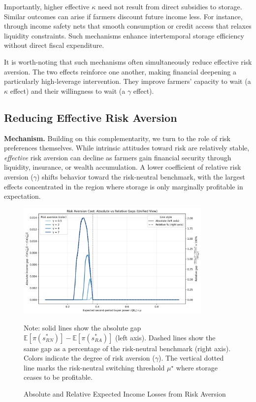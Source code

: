 Importantly, higher effective $\kappa$ need not result from direct subsidies to storage. Similar outcomes can arise if farmers discount future income less. For instance, through income safety nets that smooth consumption or credit access that relaxes liquidity constraints. Such mechanisms enhance intertemporal storage efficiency without direct fiscal expenditure. 

It is worth-noting that such mechanisms often simultaneously reduce effective risk aversion. The two effects reinforce one another, making financial deepening a particularly high-leverage intervention. They improve farmers' capacity to wait (a $\kappa$ effect) and their willingness to wait (a $\gamma$ effect).







\subsection{Reducing Effective Risk Aversion}

\textbf{Mechanism.} Building on this complementarity, we turn to the role of risk preferences themselves. While intrinsic attitudes toward risk are relatively stable, \emph{effective} risk aversion can decline as farmers gain financial security through liquidity, insurance, or wealth accumulation. A lower coefficient of relative risk aversion ($\gamma$) shifts behavior toward the risk-neutral benchmark, with the largest effects concentrated in the region where storage is only marginally profitable in expectation.


\begin{figure}[ht!]
    \centering
    \includegraphics[width=0.85\textwidth]{model_figures/income_gap_vs_mu_(unified).png}
    \caption{Absolute and Relative Expected Income Losses from Risk Aversion}
    \label{fig:unified_gap_plot}
    \begin{tablenotes}[flushleft]
    \footnotesize
    \item Note: solid lines show the absolute gap $\mathbb{E}[\pi(s^*_{RN})]-\mathbb{E}[\pi(s^*_{RA})]$ (left axis). 
    Dashed lines show the same gap as a percentage of the risk-neutral benchmark (right axis). 
    Colors indicate the degree of risk aversion ($\gamma$). 
    The vertical dotted line marks the risk-neutral switching threshold $\mu^\star$ where storage ceases to be profitable.
    \end{tablenotes}
\end{figure}


